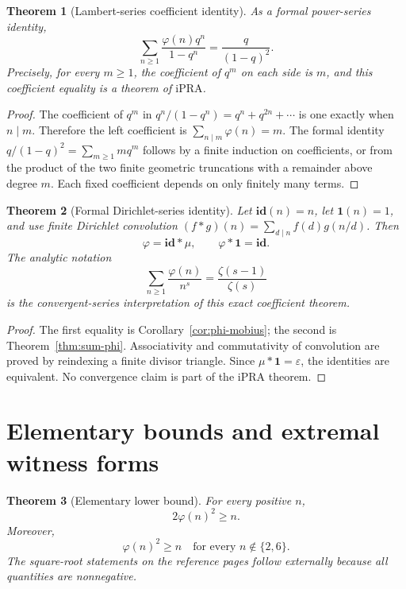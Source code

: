 \documentclass[11pt]{article}
\newtheorem{theorem}{Theorem}[section]
\theoremstyle{definition}
\newcommand{\ipra}{\mathrm{iPRA}}
\begin{document}
\begin{theorem}[Lambert-series coefficient identity]\label{thm:lambert}
As a formal power-series identity,
\[
 \boxed{\displaystyle
 \sum_{n\ge1}\frac{\varphi(n)q^n}{1-q^n}=\frac q{(1-q)^2}.}
\]
Precisely, for every \(m\ge1\), the coefficient of \(q^m\) on each side is
\(m\), and this coefficient equality is a theorem of \(\ipra\).
\end{theorem}

\begin{proof}
The coefficient of \(q^m\) in
\(q^n/(1-q^n)=q^n+q^{2n}+\cdots\) is one exactly when \(n\mid m\).  Therefore
the left coefficient is \(\sum_{n\mid m}\varphi(n)=m\).  The formal identity
\(q/(1-q)^2=\sum_{m\ge1}mq^m\) follows by a finite induction on coefficients,
or from the product of the two finite geometric truncations with a remainder
above degree \(m\).  Each fixed coefficient depends on only finitely many
terms.
\end{proof}

\begin{theorem}[Formal Dirichlet-series identity]\label{thm:phi-dirichlet}
Let \(\mathbf{id}(n)=n\), let \(\mathbf{1}(n)=1\), and use finite Dirichlet
convolution
\((f*g)(n)=\sum_{d\mid n}f(d)g(n/d)\).  Then
\[
 \boxed{\varphi=\mathbf{id}*\mu,\qquad
        \varphi*\mathbf{1}=\mathbf{id}.}
\]
The analytic notation
\[
 \sum_{n\ge1}\frac{\varphi(n)}{n^s}
 =\frac{\zeta(s-1)}{\zeta(s)}
\]
is the convergent-series interpretation of this exact coefficient theorem.
\end{theorem}

\begin{proof}
The first equality is Corollary~\ref{cor:phi-mobius}; the second is
Theorem~\ref{thm:sum-phi}.  Associativity and commutativity of convolution are
proved by reindexing a finite divisor triangle.  Since
\(\mu*\mathbf1=\varepsilon\), the identities are equivalent.  No convergence
claim is part of the \(\ipra\) theorem.
\end{proof}

\section{Elementary bounds and extremal witness forms}

\begin{theorem}[Elementary lower bound]\label{thm:phi-lower}
For every positive \(n\),
\[
 \boxed{2\varphi(n)^2\ge n.}
\]
Moreover,
\[
 \varphi(n)^2\ge n
 \quad\text{for every }n\notin\{2,6\}.
\]
The square-root statements on the reference pages follow externally because
all quantities are nonnegative.
\end{theorem}
\end{document}
